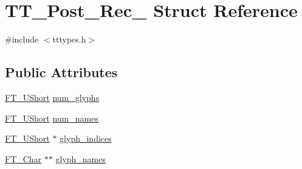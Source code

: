 \hypertarget{struct_t_t___post__20_rec__}{\section{T\-T\-\_\-\-Post\-\_\-Rec\-\_\- Struct Reference}
\label{struct_t_t___post__20_rec__}
}


{\ttfamily \#include $<$tttypes.\-h$>$}

\subsection*{Public Attributes}
\begin{DoxyCompactItemize}
\item 
\hyperlink{fttypes_8h_a937f6c17cf5ffd09086d8610c37b9f58}{F\-T\-\_\-\-U\-Short} \hyperlink{struct_t_t___post__20_rec___ae3de3677810e6581f2c197e8fa902979}{num\-\_\-glyphs}
\item 
\hyperlink{fttypes_8h_a937f6c17cf5ffd09086d8610c37b9f58}{F\-T\-\_\-\-U\-Short} \hyperlink{struct_t_t___post__20_rec___af726ff4997521c76de36f76e1203e2b1}{num\-\_\-names}
\item 
\hyperlink{fttypes_8h_a937f6c17cf5ffd09086d8610c37b9f58}{F\-T\-\_\-\-U\-Short} $\ast$ \hyperlink{struct_t_t___post__20_rec___a7f0a07ab96ccbe2597378f7aa2de3f8c}{glyph\-\_\-indices}
\item 
\hyperlink{fttypes_8h_a0f851552b050883885f0a0855771f39d}{F\-T\-\_\-\-Char} $\ast$$\ast$ \hyperlink{struct_t_t___post__20_rec___a8330fbc7db3659ac621e98d7ceb8aad3}{glyph\-\_\-names}
\end{DoxyCompactItemize}


